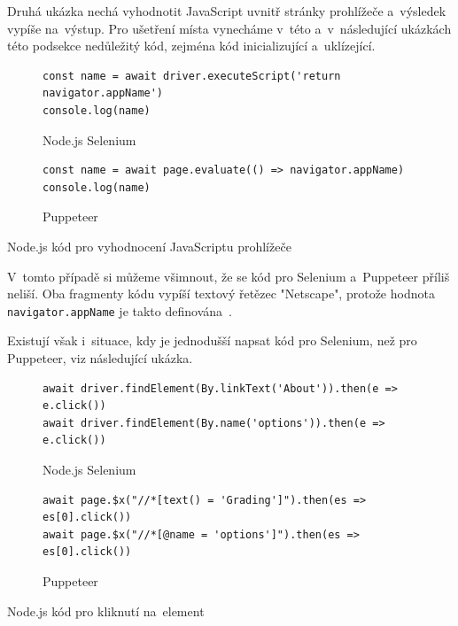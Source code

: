 \documentclass[12pt, a4paper, twoside]{article}
\begin{document}
	Druhá ukázka nechá vyhodnotit JavaScript uvnitř stránky prohlížeče a~výsledek vypíše na~výstup. Pro ušetření místa vynecháme v~této a~v~následující ukázkách této podsekce nedůležitý kód, zejména kód inicializující a~uklízející.
	\newpage
		 \begin{codefigure}[H]
		\begin{subfigure}[t]{\textwidth}
			\begin{lstlisting}[style=MyJavaScript]
const name = await driver.executeScript('return navigator.appName')
console.log(name)
			\end{lstlisting}
			\caption{Node.js Selenium}
		\end{subfigure}   
	\end{codefigure}
	\begin{codefigure}[H]\ContinuedFloat
		\begin{subfigure}[t]{\textwidth}
			\begin{lstlisting}[style=MyJavaScript]
const name = await page.evaluate(() => navigator.appName)
console.log(name)
			\end{lstlisting}
			\caption{Puppeteer}
		\end{subfigure}
		\caption{Node.js kód pro vyhodnocení JavaScriptu prohlížeče}
	\end{codefigure}

	V~tomto případě si můžeme všimnout, že se kód pro Selenium a~Puppeteer příliš neliší. Oba fragmenty kódu vypíší textový řetězec "Netscape", protože hodnota \texttt{navigator.appName} je takto definována~\cite{navigator.appName}.
	
	Existují však i~situace, kdy je jednodušší napsat kód pro Selenium, než pro Puppeteer, viz následující ukázka.
\begin{codefigure}[H]
	\begin{subfigure}[t]{\textwidth}
		\begin{lstlisting}[style=MyJavaScript]
await driver.findElement(By.linkText('About')).then(e => e.click())
await driver.findElement(By.name('options')).then(e => e.click())
		\end{lstlisting}
		\caption{Node.js Selenium}
	\end{subfigure}   
\end{codefigure}
\begin{codefigure}[H]\ContinuedFloat
	\begin{subfigure}[t]{\textwidth}
		\begin{lstlisting}[style=MyJavaScript]
await page.$x("//*[text() = 'Grading']").then(es => es[0].click())
await page.$x("//*[@name = 'options']").then(es => es[0].click())
		\end{lstlisting}
		\caption{Puppeteer}
	\end{subfigure}
	\caption{Node.js kód pro kliknutí na~element}
\end{codefigure}
\end{document}
